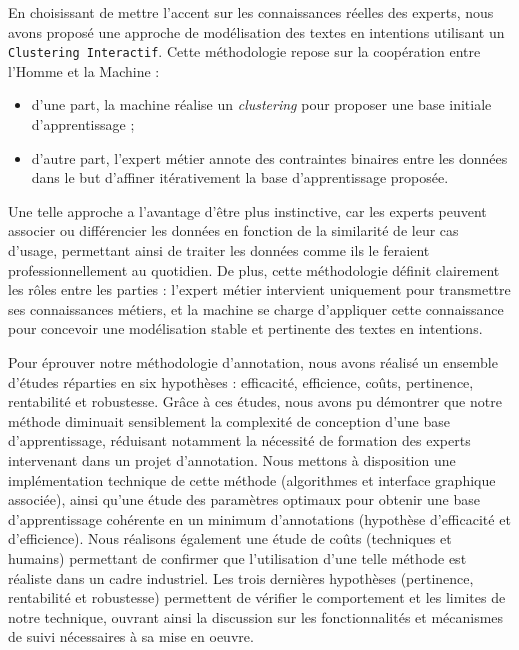		En choisissant de mettre l'accent sur les connaissances réelles des experts, nous avons proposé une approche de modélisation des textes en intentions utilisant un \texttt{Clustering Interactif}.
		Cette méthodologie repose sur la coopération entre l'Homme et la Machine :
		\begin{itemize}
			\item d'une part, la machine réalise un \textit{clustering} pour proposer une base initiale d'apprentissage ;
			\item d'autre part, l'expert métier annote des contraintes binaires entre les données dans le but d'affiner itérativement la base d'apprentissage proposée.
		\end{itemize}
		Une telle approche a l'avantage d'être plus instinctive, car les experts peuvent associer ou différencier les données en fonction de la similarité de leur cas d'usage, permettant ainsi de traiter les données comme ils le feraient professionnellement au quotidien.
		De plus, cette méthodologie définit clairement les rôles entre les parties : l'expert métier intervient uniquement pour transmettre ses connaissances métiers, et la machine se charge d'appliquer cette connaissance pour concevoir une modélisation stable et pertinente des textes en intentions.
		
		
		Pour éprouver notre méthodologie d'annotation, nous avons réalisé un ensemble d'études réparties en six hypothèses : efficacité, efficience, coûts, pertinence, rentabilité et robustesse.
		Grâce à ces études, nous avons pu démontrer que notre méthode diminuait sensiblement la complexité de conception d'une base d'apprentissage, réduisant notamment la nécessité de formation des experts intervenant dans un projet d'annotation.
		Nous mettons à disposition une implémentation technique de cette méthode (algorithmes et interface graphique associée), ainsi qu'une étude des paramètres optimaux pour obtenir une base d'apprentissage cohérente en un minimum d'annotations (hypothèse d'efficacité et d'efficience).
		Nous réalisons également une étude de coûts (techniques et humains) permettant de confirmer que l'utilisation d'une telle méthode est réaliste dans un cadre industriel.
		Les trois dernières hypothèses (pertinence, rentabilité et robustesse) permettent de vérifier le comportement et les limites de notre technique, ouvrant ainsi la discussion sur les fonctionnalités et mécanismes de suivi nécessaires à sa mise en oeuvre.
		
